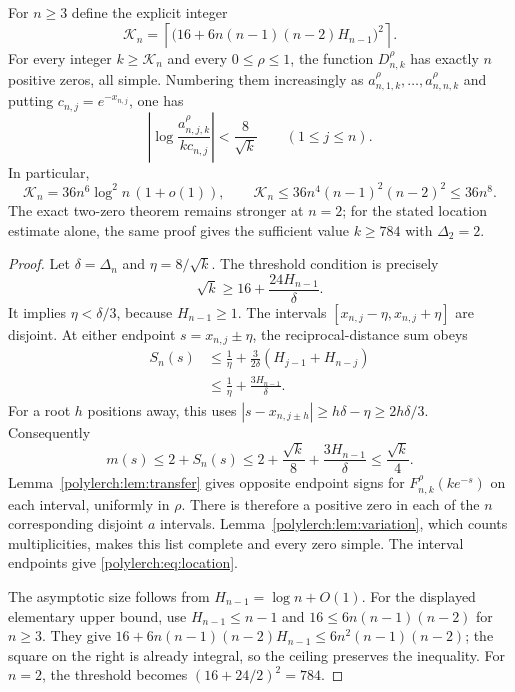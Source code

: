 \begin{theorem}
\label{polylerch:thm:saturation}
For $n\ge3$ define the explicit integer
\begin{equation}\label{polylerch:eq:threshold}
 \mathcal K_n=
 \left\lceil\bigl(16+6n(n-1)(n-2)H_{n-1}\bigr)^2\right\rceil.
\end{equation}
For every integer $k\ge\mathcal K_n$ and every $0\le\rho\le1$,
the function $D_{n,k}^{\rho}$ has exactly $n$ positive zeros, all simple.
Numbering them increasingly as $a_{n,1,k}^{\rho},\ldots,a_{n,n,k}^{\rho}$
and putting $c_{n,j}=e^{-x_{n,j}}$, one has
\begin{equation}\label{polylerch:eq:location}
 \left|\log\frac{a_{n,j,k}^{\rho}}{kc_{n,j}}\right|
 <\frac8{\sqrt k}\qquad(1\le j\le n).
\end{equation}
In particular,
\[
 \mathcal K_n=36n^6\log^2 n\,(1+o(1)),\qquad
 \mathcal K_n\le36n^4(n-1)^2(n-2)^2\le36n^8.
\]
The exact two-zero theorem remains stronger at $n=2$; for the stated
location estimate alone, the same proof gives the sufficient value
$k\ge784$ with $\Delta_2=2$.
\end{theorem}
\begin{proof}
Let $\delta=\Delta_n$ and $\eta=8/\sqrt k$. The threshold condition is
precisely
\[
 \sqrt k\ge16+\frac{24H_{n-1}}\delta.
\]
It implies $\eta<\delta/3$, because $H_{n-1}\ge1$. The intervals
$[x_{n,j}-\eta,x_{n,j}+\eta]$ are disjoint. At either endpoint
$s=x_{n,j}\pm\eta$, the reciprocal-distance sum obeys
\begin{align*}
 S_n(s)&\le\frac1\eta+
       \frac3{2\delta}(H_{j-1}+H_{n-j})\\
 &\le\frac1\eta+\frac{3H_{n-1}}\delta.
\end{align*}
For a root $h$ positions away, this uses
$|s-x_{n,j\pm h}|\ge h\delta-\eta\ge2h\delta/3$.
Consequently
\[
 m(s)\le2+S_n(s)
 \le2+\frac{\sqrt k}8+\frac{3H_{n-1}}\delta
 \le\frac{\sqrt k}4.
\]
Lemma~\ref{polylerch:lem:transfer} gives opposite endpoint signs for
$F_{n,k}^{\rho}(ke^{-s})$ on each interval, uniformly in $\rho$.
There is therefore a positive zero in each of the $n$ corresponding
disjoint $a$ intervals. Lemma~\ref{polylerch:lem:variation}, which counts
multiplicities, makes this list complete and every zero simple. The
interval endpoints give \eqref{polylerch:eq:location}.

The asymptotic size follows from $H_{n-1}=\log n+O(1)$. For the
displayed elementary upper bound, use $H_{n-1}\le n-1$ and
$16\le6n(n-1)(n-2)$ for $n\ge3$. They give
$16+6n(n-1)(n-2)H_{n-1}\le6n^2(n-1)(n-2)$;
the square on the right is already integral, so the ceiling preserves
the inequality. For $n=2$, the threshold becomes $(16+24/2)^2=784$.
\end{proof}

